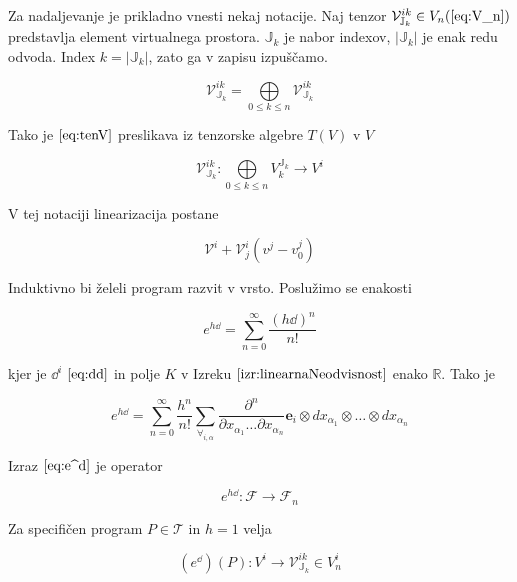 \documentclass{article}
\newcommand{\RR}{\mathbb{R}}
\newcommand{\JJ}{\mathbb{J}}
\newcommand{\T}{\mathcal{T}}
\newcommand{\VV}{\mathcal{V}}
\newcommand{\e}{\mathbf{e}}
\newcommand{\F}{\mathcal{F}}
\begin{document}
  
  Za nadaljevanje je prikladno vnesti nekaj notacije. Naj tenzor $\VV^{ik}_{\JJ_k}\in V_n (\ref{eq:V_n})$ predstavlja element virtualnega prostora. $\JJ_k$ je nabor indexov, $\lvert\JJ_k\rvert$ je enak redu odvoda. Index $k=\lvert\JJ_k\rvert$, zato ga v zapisu izpuščamo. 
  
  \begin{equation}\label{eq:tenV}
  	\VV^{ik}_{\JJ_k}= \bigoplus\limits_{0\le k\le n} \VV^{ik}_{\JJ_k}
  \end{equation}
  
  Tako je $\eqref{eq:tenV}$ preslikava iz tenzorske algebre $T(V)$ v $V$
  
  \begin{equation}\label{eq:vto}
  	\VV^{ik}_{\JJ_k}:\bigoplus\limits_{0\le k\le n}V^{\JJ_k}_{k}\to V^i
  \end{equation}
  
  V tej notaciji linearizacija postane
  
  \begin{equation}\label{eq:linear}
 	\VV^i+\VV^i_j(v^j-v_0^j)
  \end{equation}
  
  Induktivno bi želeli program razvit v vrsto. Poslužimo se enakosti
  
 \begin{equation}
 	e^{h\dd}=\sum\limits_{n=0}^{\infty}\frac{(h\dd)^n}{n!}
 \end{equation}
 
 kjer je $\dd^i$ $\eqref{eq:dd}$ in polje $K$ v Izreku $\ref{izr:linearnaNeodvisnost}$ enako $\RR$. Tako je
 
 \begin{equation}\label{eq:e^d}
 	e^{h\dd}=\sum\limits_{n=0}^{\infty}\frac{h^n}{n!}\sum_{\forall_{i,\alpha}}\frac{\partial^n}{\partial
 		    x_{\alpha_1}\ldots \partial x_{\alpha_n}}\e_i\otimes
 		  dx_{\alpha_1}\otimes\ldots \otimes dx_{\alpha_n}
 \end{equation}
 
 Izraz $\eqref{eq:e^d}$ je operator
 
 \begin{equation}
 	e^{h\dd}:\F\to\F_n
 \end{equation}
 
 Za specifičen program $P\in\T$ in $h=1$ velja
 
 \begin{equation}\label{eq:specProg}
 	(e^{\dd})(P):V^i\to \VV^{ik}_{\JJ_k}\in V_n^i
 \end{equation}
 
\end{document}
